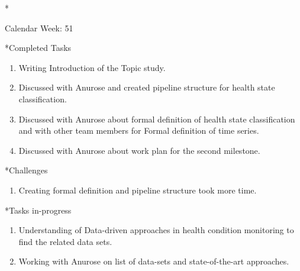 \documentclass[11pt,a4paper]{article}
\begin{document}
\newpage
\begin{section}*{Calendar Week: 51 \hfill \date{18 December, 2020}}
 \begin{refsection}

       \begin{subsection}*{Completed Tasks}
             \begin{enumerate}
                 \item Writing Introduction of the Topic study.
                 \item Discussed with Anurose and created pipeline structure for health state classification.
                 \item Discussed with Anurose about formal definition of health state classification and with other team members for Formal definition of time series.
                 \item Discussed with Anurose about work plan for the second milestone.
             \end{enumerate}
                 
       \end{subsection}
       
       \begin{subsection}*{Challenges}
		\begin{enumerate}
			\item Creating formal definition and pipeline structure took more time.
		\end{enumerate}
	\end{subsection}

       \begin{subsection}*{Tasks in-progress}
             \begin{enumerate}
                   \item Understanding of Data-driven approaches in health condition monitoring to find the related data sets. 
                   \item  Working with Anurose on list of data-sets and state-of-the-art approaches.
             \end{enumerate}
       \end{subsection}

       \printbibliography
 \end{refsection}
\end{section}
\end{document}
